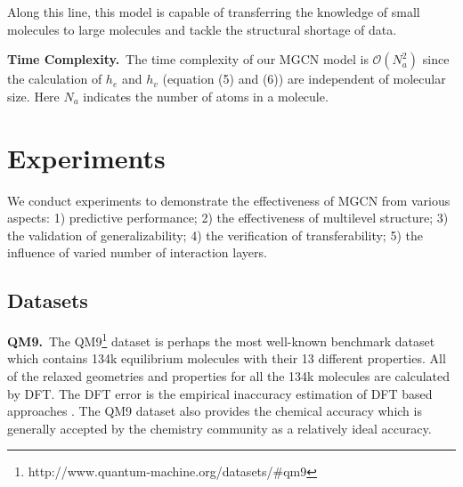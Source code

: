 \documentclass[letterpaper]{article} \usepackage{bm}
\begin{document}
Along this line, this model is capable of transferring the knowledge of small molecules to large molecules and tackle the structural shortage of data.

\textbf{Time Complexity.}\ 
The time complexity of our MGCN model is $\mathcal{O}(N^2_a)$ since the calculation of $h_e$ and $h_v$ (equation (5) and (6)) are independent of molecular size. Here $N_a$ indicates the number of atoms in a molecule.


 
\section{Experiments}

We conduct experiments to demonstrate the effectiveness of MGCN from various aspects: 1) predictive performance; 2) the effectiveness of multilevel structure; 3) the validation of generalizability; 4) the verification of transferability; 5) the influence of varied number of interaction layers.


\subsection{Datasets}



\textbf{QM9.}\ The QM9\footnote{http://www.quantum-machine.org/datasets/\#qm9} dataset \cite{ramakrishnan2014quantum} is perhaps the most well-known benchmark dataset which contains  134k equilibrium molecules with their 13 different properties. All of the relaxed geometries and properties for all the 134k molecules are calculated by DFT. The DFT error is the empirical inaccuracy estimation of DFT based approaches \cite{faber2017prediction}. The QM9 dataset also provides the chemical accuracy which is generally accepted by the chemistry community as a relatively ideal accuracy. 
\end{document}
